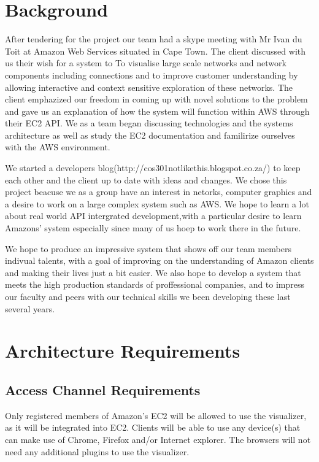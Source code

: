 \documentclass[a4paper,12pt]{report}
\begin{document}
\section{Background}

After tendering for the project our team had a skype meeting with Mr Ivan du Toit at Amazon Web Services situated in Cape Town.
The client discussed with us their wish for a system to To visualise large scale networks and network components including connections and to improve customer understanding by allowing interactive and context sensitive exploration of these networks.
The client emphazized our freedom in coming up with novel solutions to the problem and gave us an explanation of how the system will function within AWS through their EC2 API. We as a team began discussing technologies and the systems architecture as well as study the EC2 documentation and familirize ourselves with the AWS environment. 

We started a  developers blog(http://cos301notlikethis.blogspot.co.za/) to keep each other and the client up to date with ideas and changes. We chose this project beacuse we as a group have an interest in netorks, computer graphics and a desire to work on a large complex system such as AWS. We hope to learn a lot about real world API intergrated development,with a particular desire to learn Amazons' system especially since many of us hoep to work there in the future.

We hope to produce an impressive system that shows off our team members indivual talents, with a goal of improving on the understanding of Amazon clients and making their lives just a bit easier. We also hope to develop a system that meets the high production standards of proffessional companies, and to impress our faculty and peers with our technical skills we been developing these last several years.


\section{Architecture Requirements}
	\subsection{Access Channel Requirements}
		Only registered members of Amazon's EC2 will be allowed to use the visualizer, as it will be integrated into EC2. Clients will be able to use any device(s) that can make use of Chrome, Firefox and/or Internet explorer. The browsers will not need any additional plugins to use the visualizer.
\end{document}
